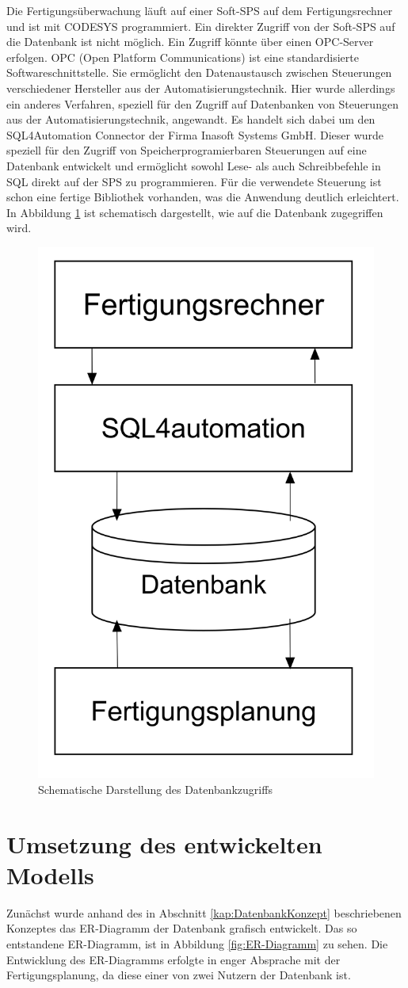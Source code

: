 Die Fertigungsüberwachung läuft auf einer Soft-SPS auf dem Fertigungsrechner und ist mit CODESYS programmiert. Ein direkter Zugriff von der Soft-SPS auf die Datenbank ist nicht möglich. Ein Zugriff könnte über einen OPC-Server erfolgen. OPC (Open Platform Communications) ist eine standardisierte Softwareschnittstelle. Sie ermöglicht den Datenaustausch zwischen Steuerungen verschiedener Hersteller aus der Automatisierungstechnik. Hier wurde allerdings ein anderes Verfahren, speziell für den Zugriff auf Datenbanken von Steuerungen aus der Automatisierungstechnik, angewandt. Es handelt sich dabei um den SQL4Automation Connector der Firma Inasoft Systems GmbH. Dieser wurde speziell für den Zugriff von Speicherprogramierbaren Steuerungen auf eine Datenbank entwickelt und ermöglicht sowohl Lese- als auch Schreibbefehle in SQL direkt auf der SPS zu programmieren. Für die verwendete Steuerung ist schon eine fertige Bibliothek vorhanden, was die Anwendung deutlich erleichtert. In Abbildung \ref{fig:DatenbankZugriffUebersicht} ist schematisch dargestellt, wie auf die Datenbank zugegriffen wird.

\begin{figure}[ht]
	    \centering
	    \includegraphics[width=0.4\linewidth]{Bilder/Datenbankdiagramm.png}
        \caption{Schematische Darstellung des Datenbankzugriffs}
        \label{fig:DatenbankZugriffUebersicht}
\end{figure}


\section{Umsetzung des entwickelten Modells}
Zunächst wurde anhand des in Abschnitt \ref{kap:DatenbankKonzept} beschriebenen Konzeptes das ER-\-Dia\-gramm der Datenbank grafisch entwickelt. Das so entstandene ER-Diagramm, ist in Abbildung \ref{fig:ER-Diagramm} zu sehen. Die Entwicklung des ER-Diagramms erfolgte in enger Absprache mit der Fertigungsplanung, da diese einer von zwei Nutzern der Datenbank ist.
 
